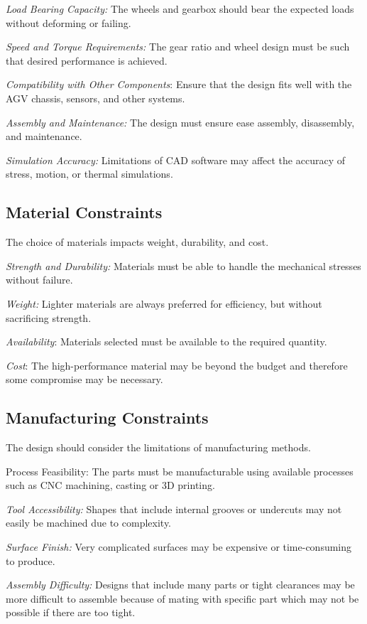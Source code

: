 \documentclass[../../main]{subfiles}
\begin{document}
\emph{ Load Bearing Capacity:} The wheels and gearbox should bear the
expected loads without deforming or failing.

\emph{Speed and Torque Requirements:} The gear ratio and wheel design
must be such that desired performance is achieved.

\emph{Compatibility with Other Components}: Ensure that the design fits
well with the AGV chassis, sensors, and other systems.

\emph{Assembly and Maintenance:} The design must ensure ease assembly,
disassembly, and maintenance.

\emph{Simulation Accuracy:} Limitations of CAD software may affect the
accuracy of stress, motion, or thermal simulations.

\subsection{Material Constraints}

The choice of materials impacts weight, durability, and cost.

\emph{Strength and Durability:} Materials must be able to handle the
mechanical stresses without failure.

\emph{Weight:} Lighter materials are always preferred for efficiency,
but without sacrificing strength.

\emph{Availability}: Materials selected must be available to the
required quantity.

\emph{Cost}: The high-performance material may be beyond the budget and
therefore some compromise may be necessary.

\subsection{Manufacturing Constraints}

The design should consider the limitations of manufacturing methods.

Process Feasibility: The parts must be manufacturable using available
processes such as CNC machining, casting or 3D printing.

\emph{Tool Accessibility:} Shapes that include internal grooves or
undercuts may not easily be machined due to complexity.

\emph{Surface Finish:} Very complicated surfaces may be expensive or
time-consuming to produce.

\emph{Assembly Difficulty:} Designs that include many parts or tight
clearances may be more difficult to assemble because of mating with
specific part which may not be possible if there are too tight.
\end{document}
